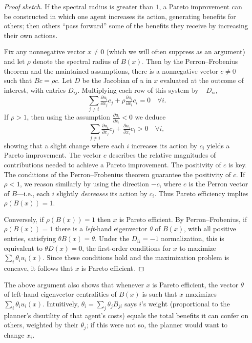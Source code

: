 \documentclass{notices}
\theoremstyle{definition}\newtheorem{problem}{Problem}
\theoremstyle{definition} \newtheorem{remark}{Remark}
\theoremstyle{definition} \newtheorem{claim}{Claim}
\theoremstyle{definition} \newtheorem{thm}{Theorem}
\theoremstyle{definition} \newtheorem*{thmNoNum}{Theorem}
\theoremstyle{definition} \newtheorem{definition}{Definition}
\theoremstyle{definition} \theoremstyle{remark}
\theoremstyle{definition} \newtheorem{note}{Note}
\theoremstyle{definition} \newtheorem{notation}{Notation}
\theoremstyle{definition} \theoremstyle{plain}
\theoremstyle{definition} \newtheorem{condition}{Condition}
\theoremstyle{definition} \newtheorem{lem}{Lemma}
\theoremstyle{definition} \newtheorem{corollary}{Corollary}
\theoremstyle{definition} \newtheorem{prop}{Proposition}
\theoremstyle{definition} \newtheorem{ax}{Axiom}
\theoremstyle{definition} \newtheorem{assumption}{Assumption}
\theoremstyle{definition} \newtheorem{example}{Example}
\theoremstyle{definition} \newtheorem{rmk}{Remark}
\theoremstyle{definition} \newtheorem{res}{Result}
\theoremstyle{definition} \newtheorem{que}{Question}
\theoremstyle{definition} \newtheorem{conjecture}{Conjecture}
\theoremstyle{definition}
\begin{document}
\begin{proof}[Proof sketch] If the spectral radius is greater than $1$, a Pareto improvement can be constructed in which one agent increases its action, generating benefits for others; then others ``pass forward'' some of the benefits they receive by increasing their own actions.  


Fix any nonnegative vector ${x} \neq 0$ (which we will often suppress as an argument) and let  $\rho$ denote the spectral radius of ${B}({x})$. Then by the Perron--Frobenius theorem and the maintained assumptions, there is a nonnegative vector $c \neq 0$ such that ${B}c=\rho c$. Let ${D}$ be the Jacobian of $u$ in $x$ evaluated at the outcome of interest, with entries $D_{ij}$. Multiplying each row of this system by $-D_{ii}$,
$$  \sum_{j \neq i} \tfrac{\partial u_i}{\partial x_j} c_j + \rho \tfrac{\partial u_i}{\partial x_i} c_i = 0 \quad \forall i.$$
If $\rho>1$, then using the assumption $\frac{\partial u_i}{\partial x_i}<0$ we deduce
\begin{equation}   \sum_{j \neq i} \tfrac{\partial u_i}{\partial x_j} c_j + \tfrac{\partial u_i}{\partial x_i} c_i > 0 \quad \forall i,\label{pareto-inequality}\end{equation}
showing that a slight change where each $i$ increases its action by $c_i$ yields a Pareto improvement. The vector ${c}$ describes the relative magnitudes of contributions needed to achieve a Pareto improvement. The positivity of ${c}$ is key. The conditions of the Perron--Frobenius theorem guarantee the positivity of ${c}$. If $\rho<1$, we reason similarly by using the direction $-c$, where $c$ is the Perron vector of ${B}$---i.e., each $i$ slightly \emph{decreases} its action by $c_i$. Thus Pareto efficiency implies $\rho({B}({x}))=1$.




Conversely, if $\rho({B}(x))=1$ then $x$ is Pareto efficient. By Perron--Frobenius, if $\rho(B(x))=1$ there is a \emph{left}-hand eigenvector ${\theta}$ of $B(x)$, with all positive entries, satisfying  ${\theta}{B}(x) = {\theta}$. Under the $D_{ii}=-1$ normalization, this is equivalent to ${\theta} D(x)=0$, the first-order conditions for $x$ to maximize $ \sum_i \theta_i u_i(x)$. Since these conditions hold and the maximization problem is concave, it follows that $x$ is Pareto efficient. \end{proof}


The above argument also shows that whenever $x$ is Pareto efficient, the vector ${\theta}$ of left-hand eigenvector centralities of ${B}({x})$ is such that ${x}$ maximizes $ \sum_i \theta_i u_i({x})$. Intuitively,  $\theta_i = \sum_j \theta_j B_{ji}$ says $i$'s weight (proportional to the planner's disutility of that agent's costs) equals the total benefits it can confer on others, weighted by their $\theta_j$; if this were not so, the planner would want to change $x_i$. 
\end{document}
